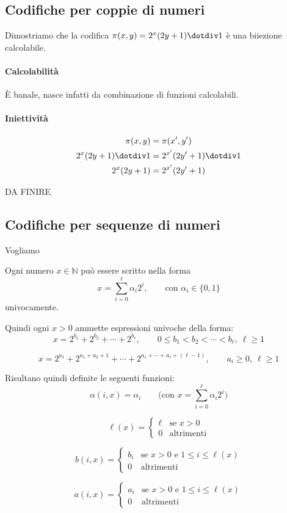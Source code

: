 	
	\subsection{Codifiche per coppie di numeri}
	Dimostriamo che la codifica $\pi(x, y) = 2^x(2y+1) \dotdiv1$ è una biiezione calcolabile.
	
	\paragraph{Calcolabilità} È banale, nasce infatti da combinazione di funzioni calcolabili.
	
	\paragraph{Iniettività} 
	$$
	\begin{aligned}
	\pi(x,y) &= \pi(x',y')\\
	2^x(2y+1) \dotdiv 1&= 2^{x'}(2y'+1) \dotdiv 1\\
	2^x(2y+1) &= 2^{x'}(2y'+1) \\
	\end{aligned}
	$$
	
	DA FINIRE
	
	\subsection{Codifiche per sequenze di numeri}
	
	Vogliamo 
	
	Ogni numero $x \in \mathbb{N}$ può essere scritto nella forma
	$$
	x = \sum_{i=0}^{\ell} \alpha_i 2^i, \qquad \text{con } \alpha_i \in \{0,1\}
	$$
	univocamente.
	
	Quindi ogni $x>0$ ammette espressioni univoche della forma:
	$$
	x = 2^{b_1} + 2^{b_2} + \cdots + 2^{b_\ell}, \qquad 0 \le b_1 < b_2 < \cdots < b_\ell,\ \ell \ge 1
	$$
	
	$$
	x = 2^{a_1} + 2^{a_1+a_2+1} + \cdots + 2^{a_1+\cdots+a_\ell+(\ell-1)}, \qquad a_i \ge 0,\ \ell \ge 1
	$$
	
	Risultano quindi definite le seguenti funzioni:
	$$
	\alpha(i,x) = \alpha_i \qquad \text{(con } x = \sum_{i=0}^{\ell} \alpha_i 2^i\text{)}
	$$
	
	$$
	\ell(x) =
	\begin{cases}
		\ell & \text{se } x>0 \\
		0 & \text{altrimenti}
	\end{cases}
	$$
	
	$$
	b(i,x) =
	\begin{cases}
		b_i & \text{se } x>0 \text{ e } 1 \le i \le \ell(x) \\
		0 & \text{altrimenti}
	\end{cases}
	$$
	
	$$
	a(i,x) =
	\begin{cases}
		a_i & \text{se } x>0 \text{ e } 1 \le i \le \ell(x) \\
		0 & \text{altrimenti}
	\end{cases}
	$$
	